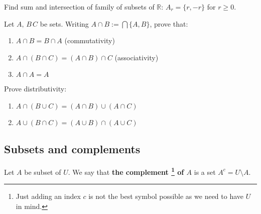 \begin{exercise}
	Find sum and intersection of family of subsets of $\mathbb R$: $A_r=\{r, -r\}$ for $r\ge 0.$
\end{exercise}

\begin{exercise}
	Let $A,\,B\,C$ be sets. Writing $A\cap B := \bigcap \{A,B\}$, prove that:
	\begin{enumerate}
		\item $A\cap B=B\cap A$ (commutativity)
		\item $A\cap (B\cap C)=(A\cap B)\cap C$ (associativity)
    \item $A\cap A=A$
	\end{enumerate}
\end{exercise}

\begin{exercise}
  Prove distributivity:
  \begin{enumerate}
    \item $A\cap (B\cup C)=(A\cap B)\cup (A\cap C)$
    \item $A\cup (B\cap C)=(A\cup B)\cap (A\cup C)$
  \end{enumerate}
\end{exercise}

%

\subsection{Subsets and complements}
\begin{definition}
  Let $A$ be subset of $U$. We say that \textbf{the complement
  \footnote{Just adding an index $c$ is not the best symbol possible as we need to have $U$ in mind.}
  of $A$} is a set $A^c=U\setminus A$.
\end{definition}


